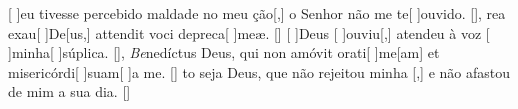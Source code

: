 {    {[ ]{eu} tivesse percebido maldade no meu  {ção}[,] o Senhor não me te[ ]{ou}{vi}do. [\LinkPT]},
  {rea exau[ ]{De}[us,] attendit voci depreca[ ]{me}æ. [\LinkLA]}%
    {[ ]{Deus} [ ]{ou}{viu}[,] atendeu à voz [ ]{mi}{nha}[ ]{súpli}ca. [\LinkPT]},
  {\textit{Be}{ne}díctus Deus, qui non amóvit orati[ ]{me}[am] et misericórdi[ ]{su}{am}[ ]{a} me. [\LinkLA]}%
    {to seja Deus, que não rejeitou minha [,] e não afastou de mim a sua dia. [\LinkPT]}
}